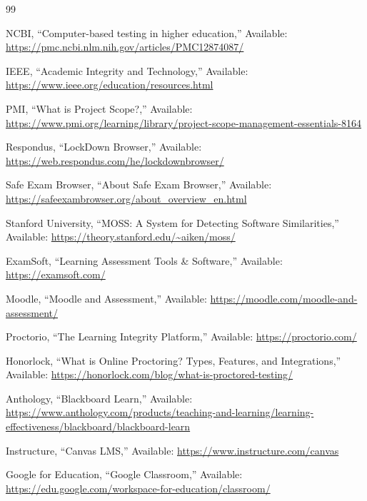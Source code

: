 \begin{thebibliography}{99}


 NCBI, ``Computer-based testing in higher education,'' Available: \url{https://pmc.ncbi.nlm.nih.gov/articles/PMC12874087/}

 IEEE, ``Academic Integrity and Technology,'' Available: \url{https://www.ieee.org/education/resources.html}

 PMI, ``What is Project Scope?,'' Available: \url{https://www.pmi.org/learning/library/project-scope-management-essentials-8164}

 Respondus, ``LockDown Browser,'' Available: \url{https://web.respondus.com/he/lockdownbrowser/}

 Safe Exam Browser, ``About Safe Exam Browser,'' Available: \url{https://safeexambrowser.org/about_overview_en.html}

 Stanford University, ``MOSS: A System for Detecting Software Similarities,'' Available: \url{https://theory.stanford.edu/~aiken/moss/}

 ExamSoft, ``Learning Assessment Tools \& Software,'' Available: \url{https://examsoft.com/}

 Moodle, ``Moodle and Assessment,'' Available: \url{https://moodle.com/moodle-and-assessment/}

 Proctorio, ``The Learning Integrity Platform,'' Available: \url{https://proctorio.com/}

 Honorlock, ``What is Online Proctoring? Types, Features, and Integrations,'' Available: \url{https://honorlock.com/blog/what-is-proctored-testing/}

 Anthology, ``Blackboard Learn,'' Available: \url{https://www.anthology.com/products/teaching-and-learning/learning-effectiveness/blackboard/blackboard-learn}

 Instructure, ``Canvas LMS,'' Available: \url{https://www.instructure.com/canvas}

 Google for Education, ``Google Classroom,'' Available: \url{https://edu.google.com/workspace-for-education/classroom/}


\end{thebibliography}

